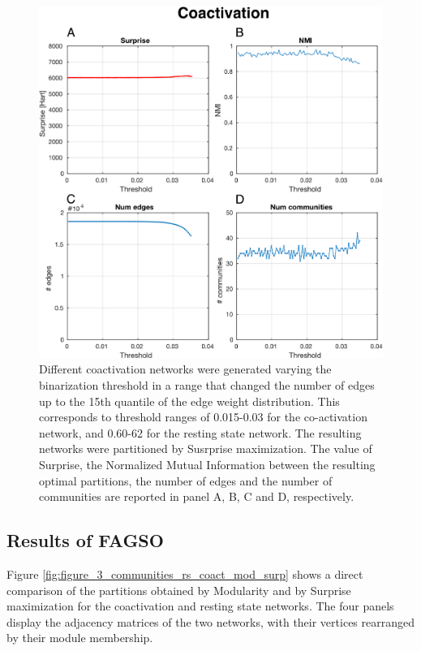 \begin{figure}[htb!]
\centering
\includegraphics[width=0.7\linewidth]{images/coactivation_study_threshold.pdf}
\caption{Different coactivation networks were generated varying the binarization threshold in a range that changed the number of edges up to the 15th quantile of the edge weight distribution. This corresponds to threshold ranges of 0.015-0.03 for the co-activation network, and 0.60-62 for the resting state network. The resulting networks were partitioned by Susrprise maximization. The value of Surprise, the Normalized Mutual Information between the resulting optimal partitions, the number of edges and the number of communities are reported in panel A, B, C and D, respectively.}
\label{fig:figure_10_rs_threshold_study}
\end{figure}

\subsection{Results of FAGSO}
Figure \ref{fig:figure_3_communities_rs_coact_mod_surp} shows a direct comparison of the partitions obtained by Modularity and by Surprise maximization for the coactivation and resting state networks. The four panels display the adjacency matrices of the two networks, with their vertices rearranged by their module membership.

